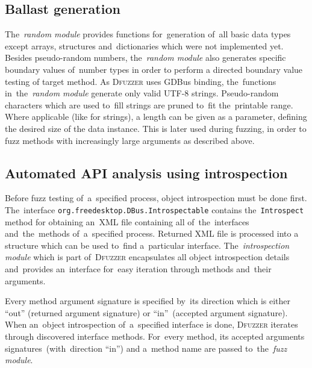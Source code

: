 \documentclass[conference]{IEEEtran}
\begin{document}
\subsection{Ballast generation} The~\emph{random module} provides functions
for~generation of~all basic data types except arrays, structures
and~dictionaries which were not implemented yet. Besides pseudo-random numbers,
the~\emph{random module} also generates specific boundary values of~number
types in order to perform a directed boundary value testing of target method.
As \textsc{Dfuzzer} uses GDBus binding, the~functions in~the~\emph{random
module} generate only valid UTF-8 strings. Pseudo-random characters which are
used to~fill strings are pruned to~fit the~printable range. Where applicable
(like for strings), a length can be given as a parameter, defining the desired
size of the data instance. This is later used during fuzzing, in order to fuzz
methods with increasingly large arguments as described above.

\subsection{Automated API analysis using introspection}
Before fuzz testing of~a~specified process, object introspection must be done
first. The~interface \texttt{org.freedesktop.DBus.Introspectable} contains
the~\texttt{Introspect} method for obtaining an~XML file containing all
of~the~interfaces and~the~methods of~a~specified process. Returned XML file is
processed into a structure which can be used to~find a~particular interface.
The~\emph{introspection module} which is part of~\textsc{Dfuzzer} encapsulates all
object introspection details and~provides an~interface for~easy iteration
through methods and~their arguments.


Every method argument signature is specified by~its
direction which is either ``out'' (returned argument signature) or
``in''~(accepted argument signature). When an~object introspection of~a~specified
interface is done, \textsc{Dfuzzer} iterates through discovered interface
methods. For~every method, its accepted arguments signatures~(with~direction
``in'') and a~method name are passed to~the~\emph{fuzz module}.
\end{document}
